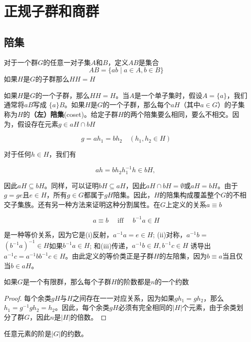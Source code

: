 \section{正规子群和商群}
\subsection{陪集}
对于一个群\(G\)的任意一对子集\(A\)和\(B\)，定义\(AB\)是集合
$$A B=\{a b \mid a \in A,b \in B\}$$
如果\(H\)是\(G\)的子群那么\(HH=H\)

如果$H$是$G$的一个子群，那么$HH=H$。当$A$是一个单子集时，假设$A=\{a\}$，我们通常将$aB$写成 $\{a\}B$。如果$H$是$G$的一个子群，那么每个$a H$（其中$a \in G$）的子集称为$H$的\textbf{（左）陪集}(coset)。给定子群$H$的两个陪集要么相同，要么不相交。因为，假设存在元素$g \in aH \cap bH$

$$g=a h_{1}=b h_{2} \quad\left(h_{1}, h_{2} \in H\right)$$

对于任何$h \in H$，我们有

$$
a h=b h_{2} h_{1}^{-1} h \in b H \text {, }
$$

因此$a H \subseteq b H$。同样，可以证明$b H \subseteq a H$，因此$a H \cap b H=\emptyset$或$a H=b H$。由于$g=ge$且$e \in H$，所有$g \in G$都属于$gH$陪集。因此，$H$的陪集构成覆盖整个$G$的不相交子集族。还有另一种方法来证明这种分割属性。在$G$上定义的关系$a \equiv b$

$$
a \equiv b \quad \text { iff } \quad b^{-1} a \in H
$$

是一种等价关系，因为它是(i)反射，$a^{-1} a=e \in H$; (ii)对称，$a^{-1} b=$ $\left(b^{-1} a\right)^{-1} \in H$如果$b^{-1} a \in H$; 和(iii)传递，$a^{-1} b \in H, b^{-1} c \in H$ 诱导出 $a^{-1} c=a^{-1} b b^{-1} c \in H$。由此定义的等价类正是子群$H$的左陪集，因为$b \equiv a$当且仅当$b \in a H$。

\begin{theorem}[拉格朗日Lagrange]\label{thm:lagrange}
    如果$G$是一个有限群，那么每个子群$H$的阶数都是$n$的一个约数
\end{theorem}
    \begin{proof}
    每个余类$gH$与$H$之间存在一一对应关系，因为如果$gh_1=gh_2$，那么$h_1=g^{-1}gh_2=h_2$。因此，每个余类$gH$必须有完全相同的$|H|$个元素，由于余类划分了群$G$，因此$n$是$|H|$的倍数。
\end{proof}
    
    \begin{corollary}
        任意元素的阶是$|G|$的约数。
    \end{corollary}
    
